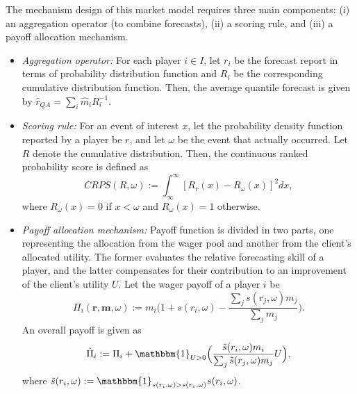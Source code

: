 \documentclass{article}
\begin{document}
The mechanism design of this market model requires three main components: (i) an aggregation operator (to combine forecasts), (ii) a scoring rule, and (iii) a payoff allocation mechanism. 
\begin{itemize}
    \item {\it Aggregation operator:}  For each player $i \in I$, let $r_i$ be the forecast report in terms of probability distribution function and $R_i$ be the corresponding cumulative distribution function. Then, the average quantile forecast is given by $\hat{r}_{QA} = \sum_i \hat{m}_i R^{-1}_i$. 
    
    \item {\it Scoring rule:} For an event of interest $x$, let the probability density function reported by a player be $r$, and let $\omega$ be the event that actually occurred. Let $R$ denote the cumulative distribution. Then, the continuous ranked probability score is defined as 
    \begin{equation*}
        CRPS(R, \omega) := \int_{\infty}^{\infty} [R_r(x) - R_{\omega}(x)]^2 dx,
    \end{equation*}
    where $R_{\omega}(x) = 0$ if $x < \omega$ and $R_{\omega}(x) = 1$ otherwise.
    
    \item {\it Payoff allocation mechanism:} Payoff function is divided in two parts, one representing the allocation from the wager pool and another from the client’s allocated utility. The former evaluates the relative forecasting skill of a player, and the latter compensates for their contribution to an improvement of the client’s utility $U$.  Let the wager payoff of a player $i$ be 
    \begin{equation*}
        \Pi_i (\mathbf{r}, \mathbf{m}, \omega) := m_i \big(1 + s(r_i, \omega) - \frac{\sum_j s(r_j, \omega) m_j}{\sum_j m_j} \big).
    \end{equation*}
    An overall payoff is given as
    \begin{equation*}
        \hat{\Pi}_i := \Pi_i + \mathbbm{1}_{U >0} \Big( \frac{\tilde{s}(r_i, \omega) m_i}{\sum_j \tilde{s}(r_j, \omega) m_j} U \Big),
    \end{equation*}
    where $\tilde{s}(r_i, \omega):=\mathbbm{1}_{s(r_i, \omega) > s(r_c, \omega)} s(r_i, \omega)$.
\end{itemize}
\end{document}
